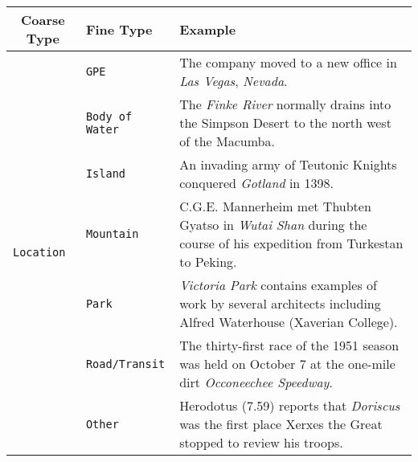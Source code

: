 \documentclass[11pt,a4paper, dvipsnames]{article}
\begin{document}
\footnotesize
\newpage
\begin{longtable}{clp{9.5cm}} 

\toprule
\textbf{Coarse Type} & \textbf{Fine Type} & \textbf{Example} \\ \midrule

\multicolumn{1}{l}{\multirow{7}{*}{\texttt{\color{BlueViolet}Location}}} & \texttt{\color{BlueViolet}GPE}                 & The company moved to a new office in \textit{\color{BlueViolet}Las Vegas}, \textit{Nevada}.                                                                                  \\ \cmidrule(r){2-2} \cmidrule(r){3-3}
\multicolumn{1}{c}{}                          & \texttt{\color{BlueViolet}Body of Water}     & The \textit{\color{BlueViolet}Finke River} normally drains into the Simpson Desert to the north west of the Macumba.                                                      \\ \cmidrule(r){2-2} \cmidrule(r){3-3}
\multicolumn{1}{c}{}                          & \texttt{\color{BlueViolet}Island}              & An invading army of Teutonic Knights conquered \textit{\color{BlueViolet}Gotland} in 1398.                                                                                \\ \cmidrule(r){2-2} \cmidrule(r){3-3}
\multicolumn{1}{c}{}                          & \texttt{\color{BlueViolet}Mountain}            & C.G.E. Mannerheim met Thubten Gyatso in \textit{\color{BlueViolet}Wutai Shan} during the course of his expedition from Turkestan to Peking.                               \\ \cmidrule(r){2-2} \cmidrule(r){3-3}
\multicolumn{1}{c}{}                          & \texttt{\color{BlueViolet}Park}                & \textit{\color{BlueViolet}Victoria Park} contains examples of work by several architects including Alfred Waterhouse (Xaverian College).                                  \\ \cmidrule(r){2-2} \cmidrule(r){3-3}
\multicolumn{1}{c}{}                          & \texttt{\color{BlueViolet}Road/Transit}       & The thirty-first race of the 1951 season was held on October 7 at the one-mile dirt \textit{\color{BlueViolet}Occoneechee Speedway}.                                      \\ \cmidrule(r){2-2} \cmidrule(r){3-3}
\multicolumn{1}{c}{}                          & \texttt{\color{BlueViolet}Other}               & Herodotus (7.59) reports that \textit{\color{BlueViolet}Doriscus} was the first place Xerxes the Great stopped to review his troops.                                      \\ \midrule

\end{longtable}
\end{document}
